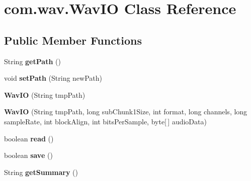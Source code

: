 \hypertarget{classcom_1_1wav_1_1_wav_i_o}{}\section{com.\+wav.\+Wav\+I\+O Class Reference}
\label{classcom_1_1wav_1_1_wav_i_o}
\subsection*{Public Member Functions}
\begin{DoxyCompactItemize}
\item 
\hypertarget{classcom_1_1wav_1_1_wav_i_o_af9f6dce5f7ade899a5edfe052e7deed6}{}String {\bfseries get\+Path} ()\label{classcom_1_1wav_1_1_wav_i_o_af9f6dce5f7ade899a5edfe052e7deed6}

\item 
\hypertarget{classcom_1_1wav_1_1_wav_i_o_a24c8926b5cbed9310f8f495b3991c41c}{}void {\bfseries set\+Path} (String new\+Path)\label{classcom_1_1wav_1_1_wav_i_o_a24c8926b5cbed9310f8f495b3991c41c}

\item 
\hypertarget{classcom_1_1wav_1_1_wav_i_o_a7ae7b501f83116930ff3b23a3708d739}{}{\bfseries Wav\+I\+O} (String tmp\+Path)\label{classcom_1_1wav_1_1_wav_i_o_a7ae7b501f83116930ff3b23a3708d739}

\item 
\hypertarget{classcom_1_1wav_1_1_wav_i_o_a843f42f2c686bb4442717ff31da303c4}{}{\bfseries Wav\+I\+O} (String tmp\+Path, long sub\+Chunk1\+Size, int format, long channels, long sample\+Rate, int block\+Align, int bits\+Per\+Sample, byte\mbox{[}$\,$\mbox{]} audio\+Data)\label{classcom_1_1wav_1_1_wav_i_o_a843f42f2c686bb4442717ff31da303c4}

\item 
\hypertarget{classcom_1_1wav_1_1_wav_i_o_a558cfecbda54ddc616bedad88a6835dc}{}boolean {\bfseries read} ()\label{classcom_1_1wav_1_1_wav_i_o_a558cfecbda54ddc616bedad88a6835dc}

\item 
\hypertarget{classcom_1_1wav_1_1_wav_i_o_a828ee12a5f9aaa5b1ab67f62be96b2f1}{}boolean {\bfseries save} ()\label{classcom_1_1wav_1_1_wav_i_o_a828ee12a5f9aaa5b1ab67f62be96b2f1}

\item 
\hypertarget{classcom_1_1wav_1_1_wav_i_o_aa8a514d3d3da993f00dac0080d4c64bf}{}String {\bfseries get\+Summary} ()\label{classcom_1_1wav_1_1_wav_i_o_aa8a514d3d3da993f00dac0080d4c64bf}

\end{DoxyCompactItemize}
